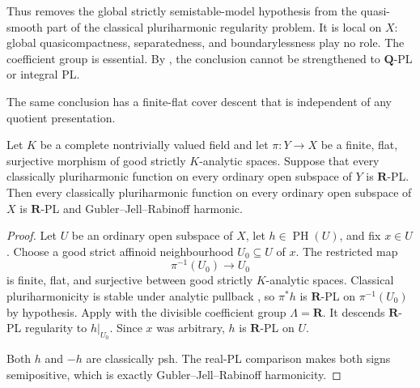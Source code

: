 


Thus  removes the global strictly
semistable-model hypothesis from the quasi-smooth part of the classical
pluriharmonic regularity problem.  It is local on \(X\): global
quasicompactness, separatedness, and boundarylessness play no role.  The
coefficient group is essential.  By
, the conclusion cannot be
strengthened to \(\mathbf Q\)-PL or integral PL.

The same conclusion has a finite-flat cover descent that is independent of
any quotient presentation.

\begin{corollary}
\label{cor:p061-finite-flat-cover-descent}
Let \(K\) be a complete nontrivially valued field and let
\(\pi:Y\to X\) be a finite, flat, surjective morphism of good strictly
\(K\)-analytic spaces.  Suppose that every classically pluriharmonic
function on every ordinary open subspace of \(Y\) is \(\mathbf R\)-PL.
Then every classically pluriharmonic function on every ordinary open subspace
of \(X\) is \(\mathbf R\)-PL and Gubler--Jell--Rabinoff harmonic.
\end{corollary}

\begin{proof}
Let \(U\) be an ordinary open subspace of \(X\), let
\(h\in\operatorname{PH}(U)\), and fix \(x\in U\).  Choose a good strict
affinoid neighbourhood \(U_0\subseteq U\) of \(x\).  The restricted map
\[
 \pi^{-1}(U_0)\longrightarrow U_0
\]
is finite, flat, and surjective between good strictly \(K\)-analytic
spaces.  Classical pluriharmonicity is stable under analytic pullback
\cite[Proposition~7.2(6)]{GR25Classical}, so \(\pi^*h\) is
\(\mathbf R\)-PL on \(\pi^{-1}(U_0)\) by hypothesis.  Apply
\cite[Proposition~5.11]{GJR26} with the divisible coefficient group
\(\Lambda=\mathbf R\).  It descends \(\mathbf R\)-PL regularity to
\(h|_{U_0}\).  Since \(x\) was arbitrary, \(h\) is \(\mathbf R\)-PL on
\(U\).

Both \(h\) and \(-h\) are classically psh.  The real-PL comparison
\cite[Theorem~4.3]{GR25Classical} makes both signs semipositive, which is
exactly Gubler--Jell--Rabinoff harmonicity.
\end{proof}

